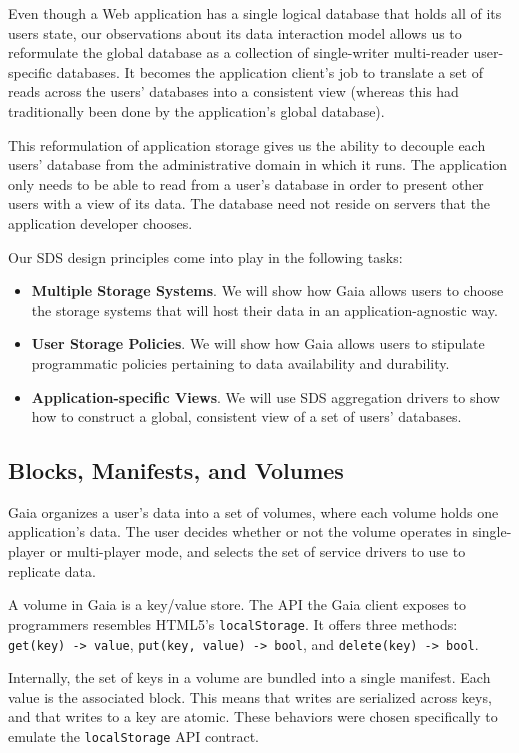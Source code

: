 Even though a Web application has a single logical database that holds all of
its users state, our observations about its data interaction model allows us to reformulate
the global database as a collection of single-writer multi-reader user-specific
databases.  It becomes the application client's job to translate a set of reads across
the users' databases into a consistent view (whereas this had traditionally been
done by the application's global database).

This reformulation of application storage gives us the ability to decouple each
users' database from the administrative domain in which it runs.  The
application only needs to be able to read from a user's database in order to
present other users with a view of its data.  The database need not reside on
servers that the application developer chooses.

Our SDS design principles come into play in the following tasks:
\begin{itemize}
   \item \textbf{Multiple Storage Systems}.  We will show how Gaia allows users
      to choose the storage systems that will host their data in an
      application-agnostic way.
   \item \textbf{User Storage Policies}.  We will show how Gaia allows users to
      stipulate programmatic policies pertaining to data availability and durability.
   \item \textbf{Application-specific Views}.  We will use SDS aggregation
      drivers to show how to construct a
      global, consistent view of a set of users' databases.
\end{itemize}

\subsection{Blocks, Manifests, and Volumes}

Gaia organizes a user's data into a set of volumes, where each volume
holds one application's data.  The user decides whether or not the volume
operates in single-player or multi-player mode, and selects the set of
service drivers to use to replicate data.

A volume in Gaia is a key/value store.  The API the Gaia client exposes to
programmers resembles HTML5's \texttt{localStorage}.  It offers three methods:
\texttt{get(key) -> value}, \texttt{put(key, value) -> bool}, and
\texttt{delete(key) -> bool}.

Internally, the set of keys in a volume are bundled into a single manifest.
Each value is the associated block.  This means that writes are serialized
across keys, and that writes to a key are atomic.  These behaviors were chosen
specifically to emulate the \texttt{localStorage} API contract.

